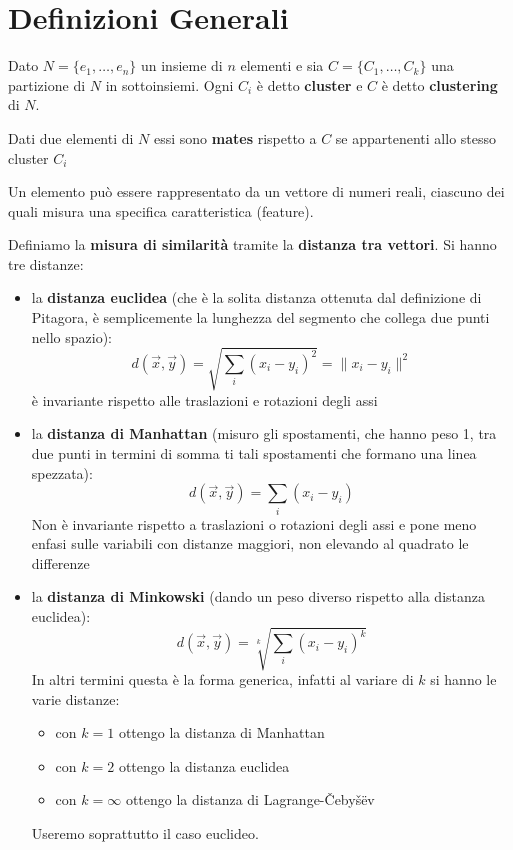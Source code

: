 \section{Definizioni Generali}
\begin{definizione}
  Dato $N=\{e_1,\ldots, e_n\}$ un insieme di $n$ elementi e sia
  $C=\{C_1,\ldots, C_k\}$ una partizione di $N$ in sottoinsiemi. Ogni $C_i$ è
  detto \textbf{cluster} e $C$ è detto \textbf{clustering} di $N$.
\end{definizione}
\begin{definizione}
  Dati due elementi di $N$ essi sono \textbf{mates} rispetto a $C$ se
  appartenenti allo stesso cluster $C_i$
\end{definizione}
Un elemento può essere rappresentato da un vettore di numeri reali, ciascuno dei
quali misura una specifica caratteristica (feature).\\
\begin{definizione}
  Definiamo la \textbf{misura di similarità} tramite la \textbf{distanza tra
    vettori}. Si hanno tre distanze:
  \begin{itemize}
    \item la \textbf{distanza euclidea} (che è la solita distanza ottenuta dal
    definizione di Pitagora, è semplicemente la lunghezza del segmento che collega
    due punti nello spazio):
    \[d(\vec{x},\vec{y})=\sqrt{\sum_i (x_i-y_i)^2} = \lVert x_i - y_i \rVert^2\]
    è invariante rispetto alle  traslazioni e rotazioni degli assi
    \item la \textbf{distanza di Manhattan} (misuro gli spostamenti, che hanno
    peso 1, tra due punti in termini di somma ti tali spostamenti che formano
    una linea spezzata):
    \[d(\vec{x},\vec{y})=\sum_i (x_i-y_i)\]
    Non è invariante rispetto a traslazioni o rotazioni degli assi e pone meno
    enfasi sulle variabili con distanze maggiori, non elevando al quadrato le
    differenze
    
    \item la \textbf{distanza di Minkowski} (dando un peso diverso rispetto alla
    distanza euclidea):
    \[d(\vec{x},\vec{y})=\sqrt[k]{\sum_i (x_i-y_i)^k}\]
    In altri termini questa è la forma generica, infatti al variare di $k$ si
    hanno le varie distanze:
    \begin{itemize}
      \item con $k=1$ ottengo la distanza di Manhattan
      \item con $k=2$ ottengo la distanza euclidea
      \item con $k=\infty$ ottengo la distanza di Lagrange-\v{C}eby\v{s}\"{e}v
    \end{itemize}
    Useremo soprattutto il caso euclideo.
  \end{itemize}
\end{definizione}
